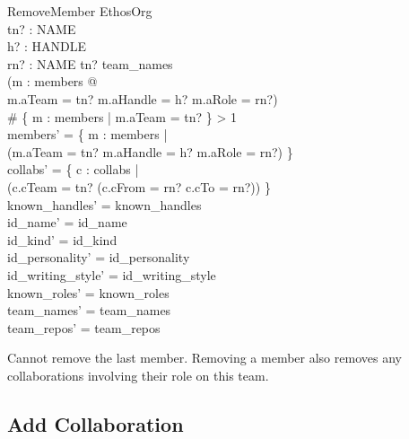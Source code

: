 \documentclass[a4paper,10pt,fleqn]{article}
\begin{document}
\begin{schema}{RemoveMember}
  \Delta EthosOrg \\
  tn? : NAME \\
  h? : HANDLE \\
  rn? : NAME
\where
  tn? \in team\_names \\
  (\exists m : members @ \\
  \quad m.aTeam = tn? \land m.aHandle = h? \land m.aRole = rn?) \\
  \# \{ m : members | m.aTeam = tn? \} > 1 \\
  members' = \{ m : members | \\
  \quad \lnot (m.aTeam = tn? \land m.aHandle = h? \land m.aRole = rn?) \} \\
  collabs' = \{ c : collabs | \\
  \quad \lnot (c.cTeam = tn? \land (c.cFrom = rn? \lor c.cTo = rn?)) \} \\
  known\_handles' = known\_handles \\
  id\_name' = id\_name \\
  id\_kind' = id\_kind \\
  id\_personality' = id\_personality \\
  id\_writing\_style' = id\_writing\_style \\
  known\_roles' = known\_roles \\
  team\_names' = team\_names \\
  team\_repos' = team\_repos
\end{schema}

Cannot remove the last member. Removing a member also removes any
collaborations involving their role on this team.

\subsection{Add Collaboration}
\end{document}
